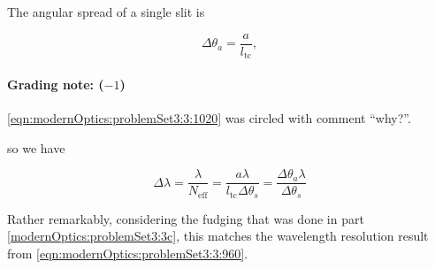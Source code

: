 {The angular spread of a single slit is

\begin{dmath}\label{eqn:modernOptics:problemSet3:3:1020}
\Delta \theta_a = \frac{a}{l_{\mathrm{tc}}},
\end{dmath}

\paragraph{Grading note: ($-1$)}
\ref{eqn:modernOptics:problemSet3:3:1020} was circled with comment ``why?''.

so we have

\begin{dmath}\label{eqn:modernOptics:problemSet3:3:1040}
\Delta \lambda
= \frac{\lambda}{ N_{\mathrm{eff}} }
= \frac{a \lambda}{
l_{\mathrm{tc}} \Delta \theta_s
}
=
\frac{\Delta \theta_a \lambda}{
\Delta \theta_s
}
\end{dmath}

Rather remarkably, considering the fudging that was done in part \ref{modernOptics:problemSet3:3c}, this matches the wavelength resolution result from \ref{eqn:modernOptics:problemSet3:3:960}.

} %
